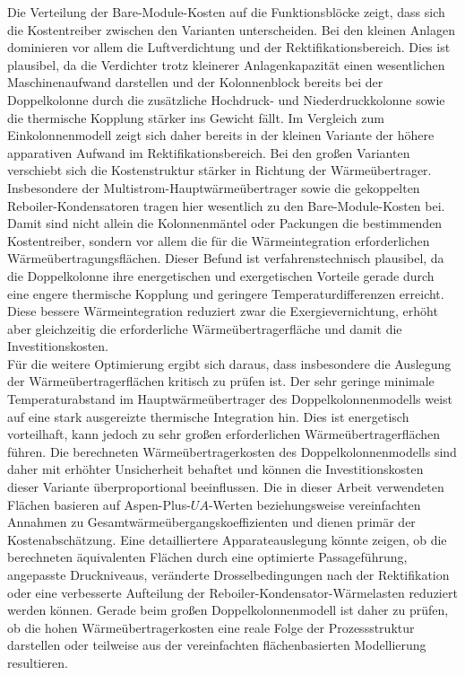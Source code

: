 Die Verteilung der Bare-Module-Kosten auf die Funktionsblöcke zeigt, dass sich die Kostentreiber zwischen den Varianten unterscheiden. Bei den kleinen Anlagen dominieren vor allem die Luftverdichtung und der Rektifikationsbereich. Dies ist plausibel, da die Verdichter trotz kleinerer Anlagenkapazität einen wesentlichen Maschinenaufwand darstellen und der Kolonnenblock bereits bei der Doppelkolonne durch die zusätzliche Hochdruck- und Niederdruckkolonne sowie die thermische Kopplung stärker ins Gewicht fällt. Im Vergleich zum Einkolonnenmodell zeigt sich daher bereits in der kleinen Variante der höhere apparativen Aufwand im Rektifikationsbereich. Bei den großen Varianten verschiebt sich die Kostenstruktur stärker in Richtung der Wärmeübertrager. Insbesondere der Multistrom-Hauptwärmeübertrager sowie die gekoppelten Reboiler-Kondensatoren tragen hier wesentlich zu den Bare-Module-Kosten bei. Damit sind nicht allein die Kolonnenmäntel oder Packungen die bestimmenden Kostentreiber, sondern vor allem die für die Wärmeintegration erforderlichen Wärmeübertragungsflächen. Dieser Befund ist verfahrenstechnisch plausibel, da die Doppelkolonne ihre energetischen und exergetischen Vorteile gerade durch eine engere thermische Kopplung und geringere Temperaturdifferenzen erreicht. Diese bessere Wärmeintegration reduziert zwar die Exergievernichtung, erhöht aber gleichzeitig die erforderliche Wärmeübertragerfläche und damit die Investitionskosten.\\


Für die weitere Optimierung ergibt sich daraus, dass insbesondere die Auslegung der Wärmeübertragerflächen kritisch zu prüfen ist.
Der sehr geringe minimale Temperaturabstand im Hauptwärmeübertrager des Doppelkolonnenmodells weist auf eine stark ausgereizte thermische Integration hin. Dies ist energetisch vorteilhaft, kann jedoch zu sehr großen erforderlichen Wärmeübertragerflächen führen. Die berechneten Wärmeübertragerkosten des Doppelkolonnenmodells sind daher mit erhöhter Unsicherheit behaftet und können die Investitionskosten dieser Variante überproportional beeinflussen. 
Die in dieser Arbeit verwendeten Flächen basieren auf Aspen-Plus-\(UA\)-Werten beziehungsweise vereinfachten Annahmen zu Gesamtwärmeübergangskoeffizienten und dienen primär der Kostenabschätzung. Eine detailliertere Apparateauslegung könnte zeigen, ob die berechneten äquivalenten Flächen durch eine optimierte Passageführung, angepasste Druckniveaus, veränderte Drosselbedingungen nach der Rektifikation oder eine verbesserte Aufteilung der Reboiler-Kondensator-Wärmelasten reduziert werden können. Gerade beim großen Doppelkolonnenmodell ist daher zu prüfen, ob die hohen Wärmeübertragerkosten eine reale Folge der Prozessstruktur darstellen oder teilweise aus der vereinfachten flächenbasierten Modellierung resultieren.

